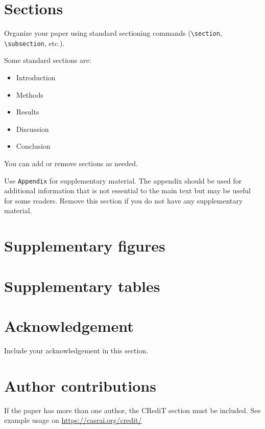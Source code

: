 \documentclass[
  manuscript=article,  %
  layout=preprint,  %
  year=20xx,
  volume=x,
]{extra/joas}
\begin{document}
\section{Sections}

Organize your paper using standard sectioning commands (\verb|\section|, \verb|\subsection|, etc.).

Some standard sections are:

\begin{itemize}
  \item Introduction
  \item Methods
  \item Results
  \item Discussion
  \item Conclusion
\end{itemize}

You can add or remove sections as needed.

Use \verb|Appendix| for supplementary material. The appendix should be used for additional information that is not essential to the main text but may be useful for some readers. Remove this section if you do not have any supplementary material.

\appendix

\section{Supplementary figures}

\section{Supplementary tables}


\section*{Acknowledgement}
Include your acknowledgement in this section.

\section*{Author contributions}
If the paper has more than one author, the CRediT section must be included. See example usage on \url{https://casrai.org/credit/}
\end{document}
